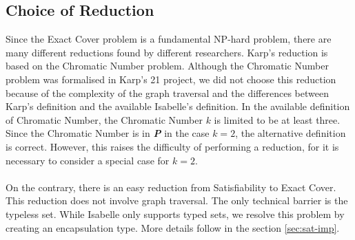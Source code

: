 \subsection{Choice of Reduction}
Since the Exact Cover problem is a fundamental NP-hard problem, there are many different reductions found by different researchers. 
Karp's reduction\cite{karp2010reducibility} is based on the  Chromatic Number problem. 
Although the Chromatic Number problem was formalised in Karp's 21 project, we did not choose this reduction
because of the complexity of the graph traversal and the differences between Karp's definition and the available Isabelle's definition. 
In the available definition of Chromatic Number, the Chromatic Number $k$ is limited to be at least three. Since 
the Chromatic Number is in \textbf{\textit{P}} in the case $k = 2$, the alternative definition is correct. However, this raises the difficulty of performing 
a reduction, for it is necessary to consider a special case for $k = 2$.\\\\ 
On the contrary, there is an easy reduction from Satisfiability to Exact Cover. This reduction does not involve graph traversal.
The only technical barrier is the typeless set. While Isabelle only supports typed sets, we resolve this problem
by creating an encapsulation type. More details follow in the section \ref*{sec:sat-imp}. 

